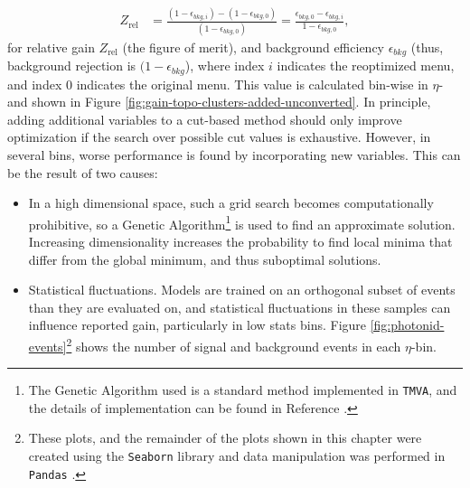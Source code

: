 \begin{align}
    Z_{\text{rel}} &= \frac{(1-\epsilon_{bkg,i}) - (1-\epsilon_{bkg,0})}{(1-\epsilon_{bkg,0})} = \frac{\epsilon_{bkg,0} - \epsilon_{bkg,i}}{1-\epsilon_{bkg,0}},
    \label{eqn:improvement-metric}
\end{align}
for relative gain $Z_{\text{rel}}$ (the figure of merit),  and background efficiency $\epsilon_{bkg}$ (thus, background rejection is $(1-\epsilon_{bkg}$), where index $i$ indicates the reoptimized menu, and index $0$ indicates the original menu. This value is calculated bin-wise in $\eta$-\pt and shown in Figure \ref{fig:gain-topo-clusters-added-unconverted}. In principle, adding additional variables to a cut-based method should only improve optimization if the search over possible cut values is exhaustive. However, in several bins, worse performance is found by incorporating new variables. This can be the result of two causes:
\begin{itemize}
    \item In a high dimensional space, such a grid search becomes computationally prohibitive, so a Genetic Algorithm\footnote{The Genetic Algorithm used is a standard method implemented in \texttt{TMVA}, and the details of implementation can be found in Reference \cite{TMVA}.} \cite{genetic-algo} is used to find an approximate solution. Increasing dimensionality increases the probability to find local minima that differ from the global minimum, and thus suboptimal solutions.
    \item Statistical fluctuations. Models are trained on an orthogonal subset of events than they are evaluated on, and statistical fluctuations in these samples can influence reported gain, particularly in low stats bins. Figure \ref{fig:photonid-events}\footnote{These plots, and the remainder of the plots shown in this chapter were created using the \texttt{Seaborn} library \cite{seaborn} and data manipulation was performed in \texttt{Pandas} \cite{pandas}.} shows the number of signal and background events in each $\eta$-\pt bin.
\end{itemize}

